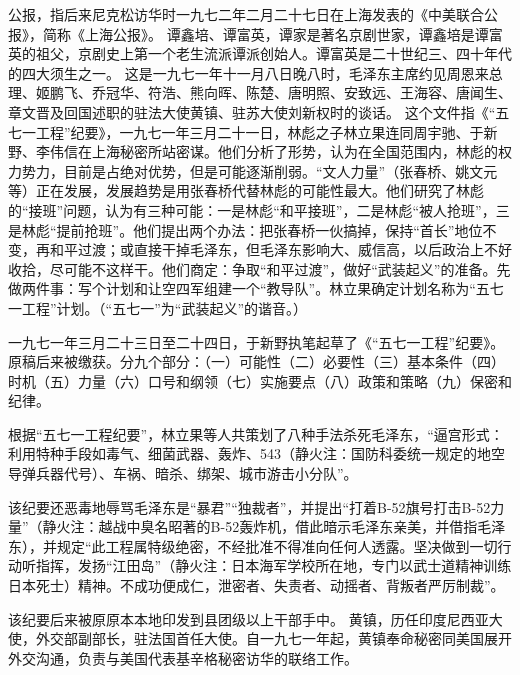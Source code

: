 \begin{maonote}
公报，指后来尼克松访华时一九七二年二月二十七日在上海发表的《中美联合公报》，简称《上海公报》。
谭鑫培、谭富英，谭家是著名京剧世家，谭鑫培是谭富英的祖父，京剧史上第一个老生流派谭派创始人。谭富英是二十世纪三、四十年代的四大须生之一。
这是一九七一年十一月八日晚八时，毛泽东主席约见周恩来总理、姬鹏飞、乔冠华、符浩、熊向晖、陈楚、唐明照、安致远、王海容、唐闻生、章文晋及回国述职的驻法大使黄镇、驻苏大使刘新权时的谈话。
这个文件指《“五七一工程”纪要》，一九七一年三月二十一日，林彪之子林立果连同周宇驰、于新野、李伟信在上海秘密所站密谋。他们分析了形势，认为在全国范围内，林彪的权力势力，目前是占绝对优势，但是可能逐渐削弱。“文人力量”（张春桥、姚文元等）正在发展，发展趋势是用张春桥代替林彪的可能性最大。他们研究了林彪的“接班”问题，认为有三种可能：一是林彪“和平接班”，二是林彪“被人抢班”，三是林彪“提前抢班”。他们提出两个办法：把张春桥一伙搞掉，保持“首长”地位不变，再和平过渡；或直接干掉毛泽东，但毛泽东影响大、威信高，以后政治上不好收拾，尽可能不这样干。他们商定：争取“和平过渡”，做好“武装起义”的准备。先做两件事：写个计划和让空四军组建一个“教导队”。林立果确定计划名称为“五七一工程”计划。（“五七一”为“武装起义”的谐音。）

一九七一年三月二十三日至二十四日，于新野执笔起草了《“五七一工程”纪要》。原稿后来被缴获。分九个部分：（一）可能性（二）必要性（三）基本条件（四）时机（五）力量（六）口号和纲领（七）实施要点（八）政策和策略（九）保密和纪律。

根据“五七一工程纪要”，林立果等人共策划了八种手法杀死毛泽东，“逼宫形式：利用特种手段如毒气、细菌武器、轰炸、543（静火注：国防科委统一规定的地空导弹兵器代号）、车祸、暗杀、绑架、城市游击小分队”。

该纪要还恶毒地辱骂毛泽东是“暴君”“独裁者”，并提出“打着B-52旗号打击B-52力量”（静火注：越战中臭名昭著的B-52轰炸机，借此暗示毛泽东亲美，并借指毛泽东），并规定“此工程属特级绝密，不经批准不得准向任何人透露。坚决做到一切行动听指挥，发扬“江田岛”（静火注：日本海军学校所在地，专门以武士道精神训练日本死士）精神。不成功便成仁，泄密者、失责者、动摇者、背叛者严厉制裁”。

该纪要后来被原原本本地印发到县团级以上干部手中。
黄镇，历任印度尼西亚大使，外交部副部长，驻法国首任大使。自一九七一年起，黄镇奉命秘密同美国展开外交沟通，负责与美国代表基辛格秘密访华的联络工作。
\end{maonote}
